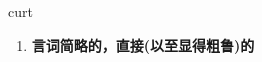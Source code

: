 
\begin{frame}
{\huge curt}
\begin{center}
\begin{enumerate}\Large
  \item \textbf{言词简略的，直接(以至显得粗鲁)的}
\end{enumerate}
\end{center}
\end{frame}
